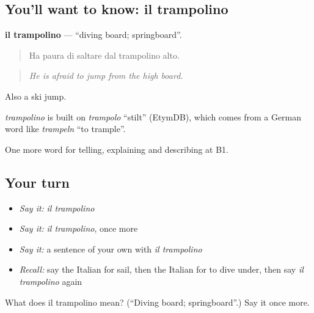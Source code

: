 \subsection*{You'll want to know: il trampolino}
\textbf{il trampolino} — \textquotedblleft{}diving board; springboard\textquotedblright{}.

\begin{quote}
Ha paura di saltare dal trampolino alto.
\end{quote}

\begin{quote}
\emph{He is afraid to jump from the high board.}
\end{quote}

Also a ski jump.

\begin{cousinweb}
\emph{trampolino} is built on \emph{trampolo} \textquotedblleft{}stilt\textquotedblright{} (EtymDB), which comes from a German word like \emph{trampeln} \textquotedblleft{}to trample\textquotedblright{}.
\end{cousinweb}

\begin{grammarlens}[title={What you've built}]
One more word for telling, explaining and describing at B1.
\end{grammarlens}

\subsection*{Your turn}
\begin{itemize}
\raggedright
  \item \emph{Say it:} \emph{il trampolino}
  \item \emph{Say it:} \emph{il trampolino}, once more
  \item \emph{Say it:} a sentence of your own with \emph{il trampolino}
  \item \emph{Recall:} say the Italian for sail, then the Italian for to dive under, then say \emph{il trampolino} again
\end{itemize}

\begin{tcolorbox}[breakable,colback=teal!4,colframe=teal!35!black,title={Before you move on}]
What does il trampolino mean? (\textquotedblleft{}Diving board; springboard\textquotedblright{}.) Say it once more.
\end{tcolorbox}
